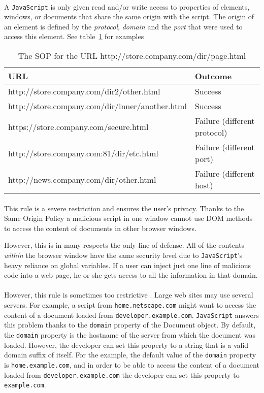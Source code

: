 \paragraph{}
A \texttt{JavaScript} is only given read and/or write access to properties of elements, windows, or documents that share the same origin with the script. The origin of an element is defined by the \emph{protocol}, \emph{domain} and the \emph{port} that were used to access this element. See table~\ref{SOP} for examples \cite{johns}
\begin{table}[h!]
\begin{tabular}{|l|l|}
      \hline
      URL & Outcome\\
      \hline\hline
    http://store.company.com/dir2/other.html        & Success \\
    http://store.company.com/dir/inner/another.html & Success \\
    https://store.company.com/secure.html           & Failure (different protocol) \\
    http://store.company.com:81/dir/etc.html        & Failure (different port) \\
    http://news.company.com/dir/other.html          & Failure (different host) \\      
      \hline
\end{tabular}
\caption{The SOP for the URL http://store.company.com/dir/page.html}\label{SOP}
\end{table}
\paragraph{}
This rule is a severe restriction and ensures the user's privacy. Thanks to the Same Origin Policy a malicious script in one window cannot use DOM methods to access the content of documents in other browser windows.

However, this is in many respects the only line of defense. All of the contents \emph{within} the browser window have the same security level due to \texttt{JavaScript}'s heavy reliance on global variables. If a user can inject just one line of malicious code into a web page, he or she gets access to all the information in that domain.

\paragraph{}
However, this rule is sometimes too restrictive \cite{guide}. Large web sites may use several servers. For example, a script from \texttt{home.netscape.com} might want to access the content of a document loaded from \texttt{developer.example.com}. \texttt{JavaScript} answers this problem thanks to the \texttt{domain} property of the Document object. By default, the \texttt{domain} property is the hostname of the server from which the document was loaded. However, the developer can set this property to a string that is a valid domain suffix of itself. For the example, the default value of the \texttt{domain} property is \texttt{home.example.com}, and in order to be able to access the content of a document loaded from \texttt{developer.example.com} the developer can set this property to \texttt{example.com}.

